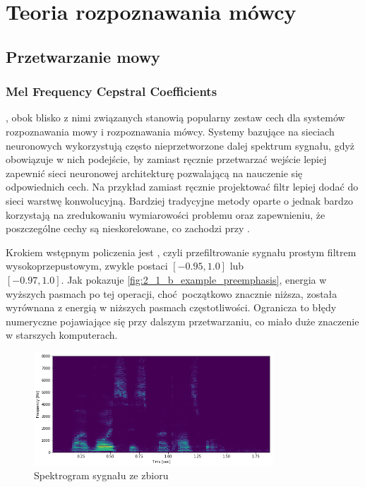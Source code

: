 \chapter{Teoria rozpoznawania mówcy}\label{chap:teoria}

\section{Przetwarzanie mowy}\label{sec:przetwarzanie_mowy}

\subsection{Mel Frequency Cepstral Coefficients}\label{sec:mfcc}

, obok blisko z nimi związanych  stanowią popularny zestaw
cech dla systemów rozpoznawania mowy i rozpoznawania mówcy. Systemy bazujące na sieciach
neuronowych wykorzystują często nieprzetworzone dalej spektrum sygnału, gdyż obowiązuje
w nich podejście, by zamiast ręcznie przetwarzać wejście lepiej zapewnić sieci neuronowej
architekturę pozwalającą na nauczenie się odpowiednich cech. Na przykład zamiast ręcznie
projektować filtr lepiej dodać do sieci warstwę konwolucyjną. Bardziej tradycyjne metody
oparte o  jednak bardzo korzystają na zredukowaniu wymiarowości problemu
oraz zapewnieniu, że poszczególne cechy są nieskorelowane, co zachodzi przy .

Krokiem wstępnym policzenia  jest , czyli przefiltrowanie sygnału
prostym filtrem wysokoprzepustowym, zwykle postaci $[-0.95, 1.0]$ lub \\ $[-0.97, 1.0]$.
Jak pokazuje \ref{fig:2_1_b_example_preemphasis}, energia w wyższych pasmach po tej operacji,
choć początkowo znacznie niższa, została wyrównana z energią w niższych pasmach częstotliwości.
Ogranicza to błędy numeryczne
pojawiające się przy dalszym przetwarzaniu, co miało duże znaczenie w starszych komputerach.

\begin{figure}[H]
    \centering
    \includegraphics[width=0.8\textwidth]{images/2_1_a_example_spectrogram}
    \caption{Spektrogram sygnału  ze zbioru }
    \label{fig:2_1_a_example_spectrogram}
\end{figure}


